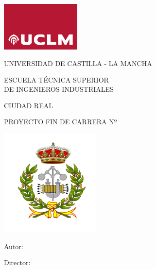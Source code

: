 \documentclass[twoside,openright,12pt]{report}
\begin{document}
\pagestyle{empty}
\begin{titlepage}

\begin{center}
\includegraphics[width=4cm]{uclm_logo} %
\bigskip
\medskip

\fontsize{17pt}{19pt}
{\selectfont  UNIVERSIDAD DE CASTILLA - LA MANCHA} \\ 
\bigskip
\smallskip

{\selectfont ESCUELA TÉCNICA SUPERIOR \\ \medskip
DE INGENIEROS INDUSTRIALES}


\bigskip
\medskip
{}\fontsize{15pt}{17pt}
{\selectfont CIUDAD REAL}

\vspace*{2cm} 

\fontsize{17pt}{19pt}
{\selectfont
PROYECTO FIN DE CARRERA Nº \makenumero \\
\bigskip
\bigskip
\bigskip
\maketitulo}

\vspace{\fill}

\noindent\begin{minipage}{0.42\textwidth}
\quad\includegraphics[width=5cm]{etsii_02} %
\end{minipage}
\begin{minipage}{0.55\textwidth}
  \begin{flushleft}
\fontsize{15pt}{15pt}
{\selectfont
 Autor:\\[-.2mm]
\makeautor

\bigskip
Director:\\[-.2mm]
\makedirector

\bigskip
\makefecha
}
  \end{flushleft}
\end{minipage}
\end{center}
\end{titlepage}
\end{document}
